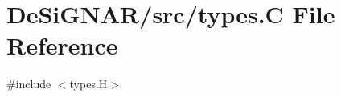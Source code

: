 \hypertarget{types_8_c}{}\section{De\+Si\+G\+N\+A\+R/src/types.C File Reference}
\label{types_8_c}
{\ttfamily \#include $<$types.\+H$>$}\newline
